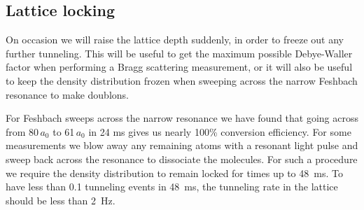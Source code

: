 \documentclass[11pt,letter]{article}
\begin{document}
\subsection{Lattice locking}

On occasion we will raise the lattice depth suddenly, in order to freeze out any
further tunneling.   This will be useful to get the maximum possible
Debye-Waller factor when performing a Bragg scattering measurement,  or it will
also be useful to keep the density distribution frozen when sweeping across the
narrow Feshbach resonance to make doublons.   

For Feshbach sweeps across the narrow resonance we have found that going
across from 80\,$a_{0}$ to 61\,$a_{0}$ in 24 ms gives us nearly 100\%
conversion efficiency. For some measurements we blow away any remaining atoms
with a resonant light pulse and sweep back across the resonance to dissociate
the molecules.  For such a procedure we require the density distribution to
remain locked for times up to 48~ms.  To have less than 0.1 tunneling events
in 48~ms, the tunneling rate in the lattice should be less than 2~Hz. 
\end{document}
